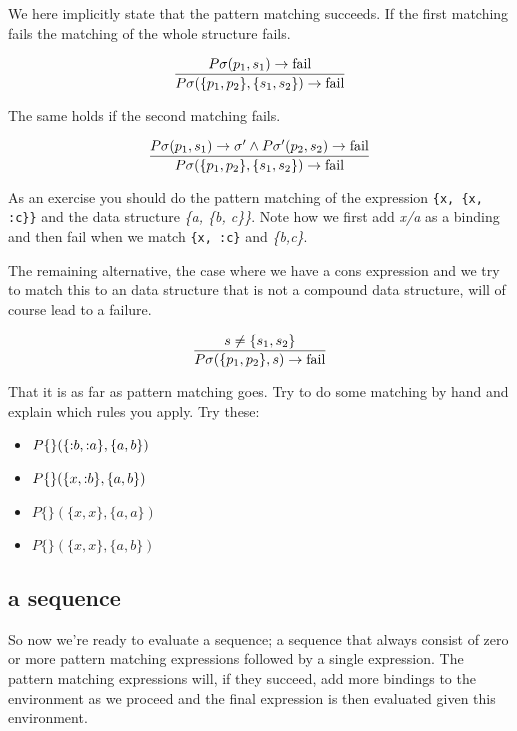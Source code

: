 \documentclass[a4paper,11pt]{article}
\begin{document}
We here implicitly state that the pattern matching succeeds. If the first matching fails the matching of the whole structure fails.

$$\frac{P\sigma(p_1, s_1) \rightarrow {\rm fail} }{P\sigma(\lbrace p_1, p_2 \rbrace  , \lbrace s_1, s_2 \rbrace) \rightarrow {\rm fail}}$$

The same holds if the second matching fails.

$$\frac{P\sigma(p_1, s_1) \rightarrow \sigma' \wedge P\sigma'(p_2, s_2) \rightarrow {\rm fail}}{P\sigma(\lbrace p_1, p_2 \rbrace  , \lbrace s_1, s_2 \rbrace) \rightarrow {\rm fail}}$$


As an exercise you should do the pattern matching of the expression
{\tt \{x, \{x, :c\}\}} and the data structure {\em \{a, \{b, c\}\}}. Note
how we first add {\em x/a} as a binding and then fail when
we match {\tt \{x, :c\}} and {\em \{b,c\}}.

The remaining alternative, the case where we have a cons expression and
we try to match this to an data structure that is not a compound data
structure, will of course lead to a failure.

$$\frac{s \not = \{s_1, s_2\}}{P\sigma(\lbrace p_1, p_2 \rbrace, s) \rightarrow {\rm fail}}$$

That it is as far as pattern matching goes. Try to do some matching by
hand and explain which rules you apply. Try these:

\begin{itemize}
\item $P\{\}(\{ {\mathnormal :b}, {\mathnormal :a} \}, \{ a, b \})$  
\item $P\{\}(\{ x, {\mathnormal :b} \}, \{ a, b \})$
\item $P\{\}(\{ x, x \}, \{ a, a \})$
\item $P\{\}(\{ x, x \}, \{ a, b \})$
\end{itemize}



\subsection{a sequence}

So now we're ready to evaluate a sequence; a sequence that always
consist of zero or more pattern matching expressions followed by a
single expression. The pattern matching expressions will, if they
succeed, add more bindings to the environment as we proceed and the
final expression is then evaluated given this environment.
\end{document}
